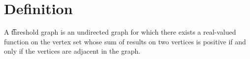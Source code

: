 
\section*{Definition}

A \t{threshold graph} is an undirected graph for which there exists a real-valued function on the vertex set whose sum of results on two vertices is positive if and only if the vertices are adjacent in the graph.
